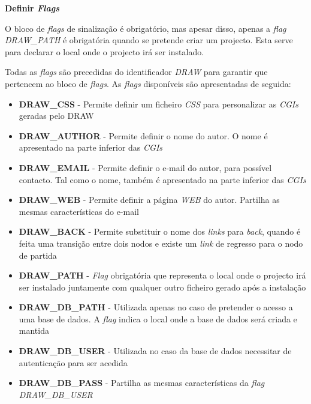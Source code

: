 \documentclass[a4paper]{article}
\begin{document}
\begin{large}
\textbf{Definir \emph{Flags}}\\
\end{large}

\hspace{1cm}O bloco de \emph{flags} de sinalização é obrigatório, mas apesar disso, apenas a \emph{flag DRAW\_PATH} é obrigatória
quando se pretende criar um projecto. Esta serve para declarar o local onde o projecto irá ser instalado.

\hspace{1cm}Todas as \emph{flags} são precedidas do identificador \emph{DRAW} para garantir que pertencem ao bloco de \emph{flags}.
As \emph{flags} disponíveis são apresentadas de seguida:\\

\begin{itemize}
        \item \textbf{DRAW\_CSS} - Permite definir um ficheiro \emph{CSS} para personalizar as \emph{CGIs} geradas pelo DRAW
        \item \textbf{DRAW\_AUTHOR} - Permite definir o nome do autor. O nome é apresentado na parte inferior das \emph{CGIs}
        \item \textbf{DRAW\_EMAIL} - Permite definir o e-mail do autor, para possível contacto. Tal como o nome, também é apresentado na
        parte inferior das \emph{CGIs}
        \item \textbf{DRAW\_WEB} - Permite definir a página \emph{WEB} do autor. Partilha as mesmas características do e-mail
        \item \textbf{DRAW\_BACK} - Permite substituir o nome dos \emph{links} para \emph{back}, quando é feita uma transição entre dois
        nodos e existe um \emph{link} de regresso para o nodo de partida
        \item \textbf{DRAW\_PATH} - \emph{Flag} obrigatória que representa o local onde o projecto irá ser instalado juntamente com qualquer
        outro ficheiro gerado após a instalação
        \item \textbf{DRAW\_DB\_PATH} - Utilizada apenas no caso de pretender o acesso a uma base de dados. A \emph{flag} indica o local onde
        a base de dados será criada e mantida
    \item \textbf{DRAW\_DB\_USER} - Utilizada no caso da base de dados necessitar de autenticação para ser acedida
        \item \textbf{DRAW\_DB\_PASS} - Partilha as mesmas características da \emph{flag DRAW\_DB\_USER}\\
\end{itemize}
\end{document}
